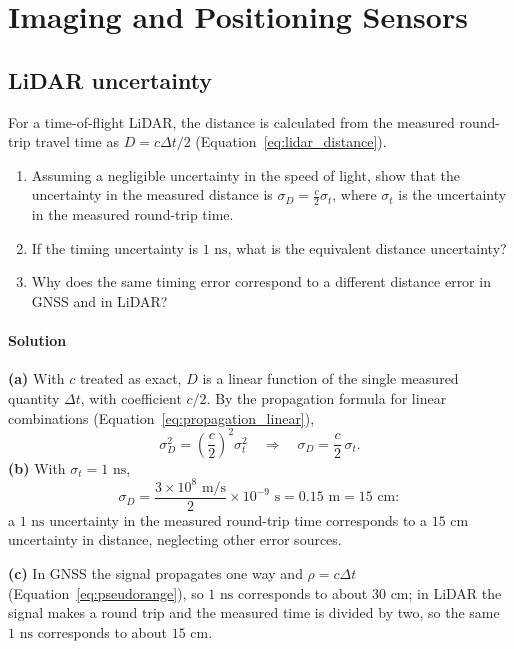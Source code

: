 \section{Imaging and Positioning Sensors}
\label{app:ex_ch5}

\subsection{LiDAR uncertainty}
\label{ex:lidar_uncertainty}

For a time-of-flight LiDAR, the distance is calculated from the measured round-trip travel time as $D = c\Delta t/2$ (Equation~\eqref{eq:lidar_distance}).
\begin{enumerate}[label=(\alph*)]
\item Assuming a negligible uncertainty in the speed of light, show that the uncertainty in the measured distance is $\sigma_D = \frac{c}{2}\sigma_t$, where $\sigma_t$ is the uncertainty in the measured round-trip time.
\item If the timing uncertainty is $1\text{ ns}$, what is the equivalent distance uncertainty?
\item Why does the same timing error correspond to a different distance error in GNSS and in LiDAR?
\end{enumerate}

\paragraph{Solution} \textbf{(a)} With $c$ treated as exact, $D$ is a linear function of the single measured quantity $\Delta t$, with coefficient $c/2$. By the propagation formula for linear combinations (Equation~\eqref{eq:propagation_linear}),
\begin{equation*}
\sigma_D^2 = \left(\frac{c}{2}\right)^2\sigma_t^2 \quad\Longrightarrow\quad \sigma_D = \frac{c}{2}\,\sigma_t.
\end{equation*}
\textbf{(b)} With $\sigma_t = 1\text{ ns}$,
\begin{equation*}
\sigma_D = \frac{3 \times 10^8\text{ m/s}}{2} \times 10^{-9}\text{ s} = 0.15\text{ m} = 15\text{ cm}:
\end{equation*}
a $1\text{ ns}$ uncertainty in the measured round-trip time corresponds to a $15\text{ cm}$ uncertainty in distance, neglecting other error sources.

\textbf{(c)} In GNSS the signal propagates one way and $\rho = c\Delta t$ (Equation~\eqref{eq:pseudorange}), so $1\text{ ns}$ corresponds to about $30\text{ cm}$; in LiDAR the signal makes a round trip and the measured time is divided by two, so the same $1\text{ ns}$ corresponds to about $15\text{ cm}$.
